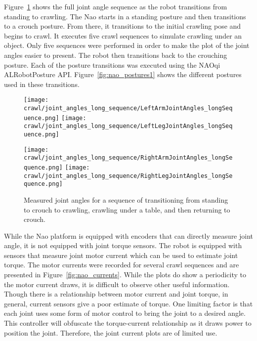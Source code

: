 Figure~\ref{fig:nao_joint_angles_long_seq} shows the full joint angle sequence as the robot
transitions from standing to crawling. The Nao starts in a standing posture and then transitions
to a crouch posture. From there, it transitions to the initial crawling pose and begins to
crawl. It executes five crawl sequences to simulate crawling under an object.
Only five sequences were performed in order to make the plot of the joint angles easier to present.
The robot then transitions back to the crouching posture. Each of the posture transitions was
executed using the NAOqi ALRobotPosture API\@.
Figure~\ref{fig:nao_postures1} shows the different postures used in these transitions.

\begin{figure}
  \centerline{
    \texttt{[image: crawl/joint\_angles\_long\_sequence/LeftArmJointAngles\_longSequence.png]}
    \texttt{[image: crawl/joint\_angles\_long\_sequence/LeftLegJointAngles\_longSequence.png]}
  }
  \centerline{
    \texttt{[image: crawl/joint\_angles\_long\_sequence/RightArmJointAngles\_longSequence.png]}
    \texttt{[image: crawl/joint\_angles\_long\_sequence/RightLegJointAngles\_longSequence.png]}
  }
  \caption{Measured joint angles for a sequence of transitioning from standing to crouch to crawling,
           crawling under a table, and then returning to crouch.}
  \label{fig:nao_joint_angles_long_seq}
\end{figure}

While the Nao platform is equipped with encoders that can directly measure joint
angle, it is not equipped with joint torque sensors. The robot is equipped with sensors
that measure joint motor current which can be used to estimate joint torque. The motor currents
were recorded for several crawl sequences and are presented in Figure~\ref{fig:nao_currents}.
While the plots do show a periodicity to the motor current draws, it is difficult to observe
other useful information. Though there is a relationship between motor current and joint torque, 
in general, current sensors give a poor estimate of torque. One limiting factor is that each joint uses
some form of motor control to bring the joint to a desired angle. This controller will
obfuscate the torque-current relationship as it draws power to position the joint.
Therefore, the joint current plots are of limited use.

